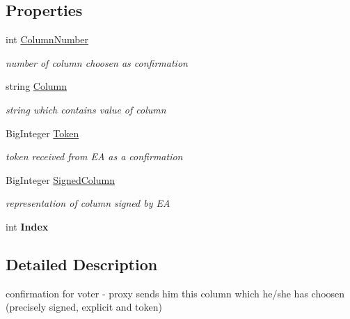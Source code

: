 \subsection*{Properties}
\begin{DoxyCompactItemize}
\item 
int \hyperlink{class_voter_1_1_confirmation_aae3d033c7c9779957eef32349c3eab1b}{Column\+Number}
\begin{DoxyCompactList}\small\item\em number of column choosen as confirmation \end{DoxyCompactList}\item 
string \hyperlink{class_voter_1_1_confirmation_abe9dfc22916b02e6d3d263453a258118}{Column}
\begin{DoxyCompactList}\small\item\em string which contains value of column \end{DoxyCompactList}\item 
Big\+Integer \hyperlink{class_voter_1_1_confirmation_a98a095f7addc84318c6092181c3b7507}{Token}
\begin{DoxyCompactList}\small\item\em token received from E\+A as a confirmation \end{DoxyCompactList}\item 
Big\+Integer \hyperlink{class_voter_1_1_confirmation_adcda91422874933f5faf189461e44ee8}{Signed\+Column}
\begin{DoxyCompactList}\small\item\em representation of column signed by E\+A \end{DoxyCompactList}\item 
\hypertarget{class_voter_1_1_confirmation_a85e0d616efa6dbdbf2f7a5a1aca9715d}{}int {\bfseries Index}\label{class_voter_1_1_confirmation_a85e0d616efa6dbdbf2f7a5a1aca9715d}

\end{DoxyCompactItemize}


\subsection{Detailed Description}
confirmation for voter -\/ proxy sends him this column which he/she has choosen (precisely signed, explicit and token) 



